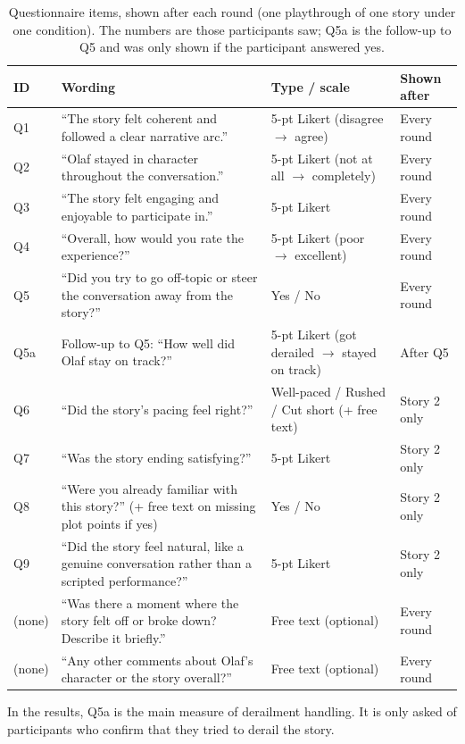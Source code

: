 \begin{table}[htbp]
\centering
\caption{Questionnaire items, shown after each round (one playthrough of one story under one condition). The numbers are those participants saw; Q5a is the follow-up to Q5 and was only shown if the participant answered yes.}
\label{tab:instrument}
\small
\begin{tabular}{p{1.6cm}p{6.3cm}p{4.2cm}p{2cm}}
\toprule
ID & Wording & Type / scale & Shown after \\
\midrule
Q1 & ``The story felt coherent and followed a clear narrative arc.'' & 5-pt Likert (disagree $\to$ agree) & Every round \\
Q2 & ``Olaf stayed in character throughout the conversation.'' & 5-pt Likert (not at all $\to$ completely) & Every round \\
Q3 & ``The story felt engaging and enjoyable to participate in.'' & 5-pt Likert & Every round \\
Q4 & ``Overall, how would you rate the experience?'' & 5-pt Likert (poor $\to$ excellent) & Every round \\
Q5 & ``Did you try to go off-topic or steer the conversation away from the story?'' & Yes / No & Every round \\
Q5a & Follow-up to Q5: ``How well did Olaf stay on track?'' & 5-pt Likert (got derailed $\to$ stayed on track) & After Q5 \\
Q6 & ``Did the story's pacing feel right?'' & Well-paced / Rushed / Cut short (+ free text) & Story 2 only \\
Q7 & ``Was the story ending satisfying?'' & 5-pt Likert & Story 2 only \\
Q8 & ``Were you already familiar with this story?'' (+ free text on missing plot points if yes) & Yes / No & Story 2 only \\
Q9 & ``Did the story feel natural, like a genuine conversation rather than a scripted performance?'' & 5-pt Likert & Story 2 only \\
(none) & ``Was there a moment where the story felt off or broke down? Describe it briefly.'' & Free text (optional) & Every round \\
(none) & ``Any other comments about Olaf's character or the story overall?'' & Free text (optional) & Every round \\
\bottomrule
\end{tabular}
\end{table}

In the results, Q5a is the main measure of derailment handling. It is only asked of participants who confirm that they tried to derail the story.

